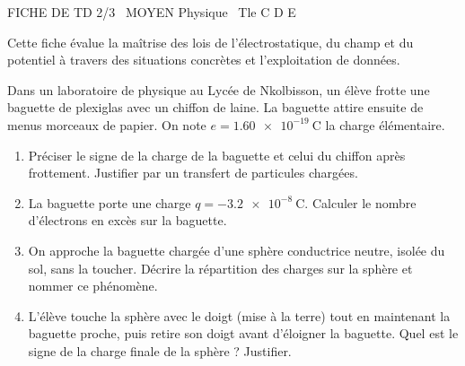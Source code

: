 \documentclass[11pt]{article}
\begin{document}
\begin{tcolorbox}[enhanced,colback=popink,colframe=popink,arc=10pt,boxrule=0pt,left=12pt,right=12pt,top=9pt,bottom=9pt]
{\color{white}\popxbold\small FICHE DE TD 2/3 \textbullet\ MOYEN \hfill Physique \textbullet\ Tle C D E\par}
\end{tcolorbox}
\vspace{4pt}
Cette fiche évalue la maîtrise des lois de l'électrostatique, du champ et du potentiel à travers des situations concrètes et l'exploitation de données.

\begin{exercice}
Dans un laboratoire de physique au Lycée de Nkolbisson, un élève frotte une baguette de plexiglas avec un chiffon de laine. La baguette attire ensuite de menus morceaux de papier. On note $e = \SI{1,60e-19}{\coulomb}$ la charge élémentaire.
\begin{enumerate}
    \item Préciser le signe de la charge de la baguette et celui du chiffon après frottement. Justifier par un transfert de particules chargées.
    \item La baguette porte une charge $q = \SI{-3,2e-8}{\coulomb}$. Calculer le nombre d'électrons en excès sur la baguette.
    \item On approche la baguette chargée d'une sphère conductrice neutre, isolée du sol, sans la toucher. Décrire la répartition des charges sur la sphère et nommer ce phénomène.
    \item L'élève touche la sphère avec le doigt (mise à la terre) tout en maintenant la baguette proche, puis retire son doigt avant d'éloigner la baguette. Quel est le signe de la charge finale de la sphère ? Justifier.
\end{enumerate}
\end{exercice}
\end{document}
